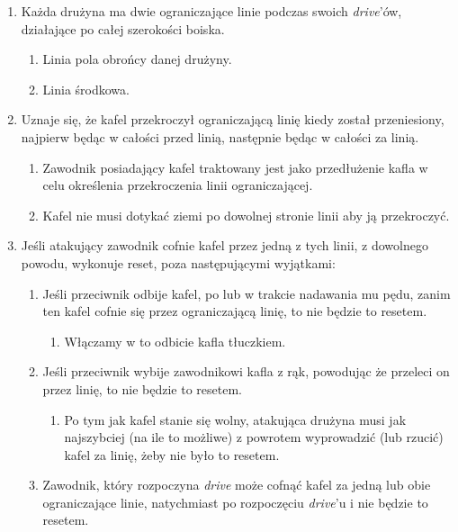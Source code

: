 \documentclass[11pt,a4paper]{article}
\begin{document}
\begin{enumerate}

\item
  Każda drużyna ma dwie ograniczające linie podczas swoich
  \emph{drive}'ów, działające po całej szerokości boiska.

  \begin{enumerate}
  
  \item
    Linia pola obrońcy danej drużyny.
  \item
    Linia środkowa.
  \end{enumerate}
\item
  Uznaje się, że kafel przekroczył ograniczającą linię kiedy został
  przeniesiony, najpierw będąc w całości przed linią, następnie będąc w
  całości za linią.

  \begin{enumerate}
  
  \item
    Zawodnik posiadający kafel traktowany jest jako przedłużenie kafla w
    celu określenia przekroczenia linii ograniczającej.
  \item
    Kafel nie musi dotykać ziemi po dowolnej stronie linii aby ją
    przekroczyć.
  \end{enumerate}
\item
  Jeśli atakujący zawodnik cofnie kafel przez jedną z tych linii, z
  dowolnego powodu, wykonuje reset, poza następującymi wyjątkami:

  \begin{enumerate}
  
  \item
    Jeśli przeciwnik odbije kafel, po lub w trakcie nadawania mu pędu,
    zanim ten kafel cofnie się przez ograniczającą linię, to nie będzie
    to resetem.

    \begin{enumerate}
    
    \item
      Włączamy w to odbicie kafla tłuczkiem.
    \end{enumerate}
  \item
    Jeśli przeciwnik wybije zawodnikowi kafla z rąk, powodując że
    przeleci on przez linię, to nie będzie to resetem.

    \begin{enumerate}
    
    \item
      Po tym jak kafel stanie się wolny, atakująca drużyna musi jak
      najszybciej (na ile to możliwe) z powrotem wyprowadzić (lub
      rzucić) kafel za linię, żeby nie było to resetem.
    \end{enumerate}
  \item
    Zawodnik, który rozpoczyna \emph{drive} może cofnąć kafel za jedną
    lub obie ograniczające linie, natychmiast po rozpoczęciu
    \emph{drive}'u i nie będzie to resetem.


\end{enumerate}
\end{enumerate}
\end{document}
